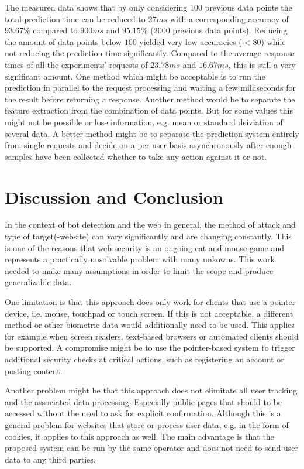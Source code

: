 \documentclass[
    fontsize=12pt,
    headings=small,
    parskip=half,           %
    bibliography=totoc,
    numbers=noenddot,       %
    open=any,               %
    final,                   %
    table
]{scrreprt}
\begin{document}
The measured data shows that by only considering $100$ previous data points the total prediction time can be reduced to $27ms$ with a corresponding accuracy of $93.67\%$ compared to $900ms$ and $95.15\%$ ($2000$ previous data points). Reducing the amount of data points below $100$ yielded very low accuracies ($<80$) while not reducing the prediction time significantly. Compared to the average response times of all the experiments' requests of $23.78ms$ and $16.67ms$, this is still a very significant amount. One method which might be acceptable is to run the prediction in parallel to the request processing and waiting a few milliseconds for the result before returning a response. Another method would be to separate the feature extraction from the combination of data points. But for some values this might not be possible or lose information, e.g. mean or standard deiviation of several data.
A better method might be to separate the prediction system entirely from single requests and decide on a per-user basis asynchronously after enough samples have been collected whether to take any action against it or not.


\chapter{Discussion and Conclusion}

In the context of bot detection and the web in general, the method of attack and type of target(-website) can vary significantly and are changing constantly. This is one of the reasons that web security is an ongoing cat and mouse game and represents a practically unsolvable problem with many unkowns. This work needed to make many assumptions in order to limit the scope and produce generalizable data.

One limitation is that this approach does only work for clients that use a pointer device, i.e. mouse, touchpad or touch screen. If this is not acceptable, a different method or other biometric data would additionally need to be used. This applies for example when screen readers, text-based browsers or automated clients should be supported. A compromise might be to use the pointer-based system to trigger additional security checks at critical actions, such as registering an account or posting content.

Another problem might be that this approach does not elimitate all user tracking and the associated data processing. Especially public pages that should to be accessed without the need to ask for explicit confirmation. Although this is a general problem for websites that store or process user data, e.g. in the form of cookies, it applies to this approach as well. The main advantage is that the proposed system can be run by the same operator and does not need to send user data to any third parties.
\end{document}
